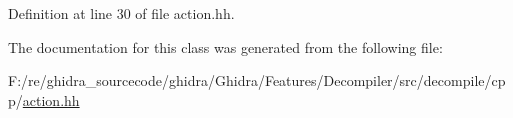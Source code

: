 Definition at line 30 of file action.\+hh.



The documentation for this class was generated from the following file\+:\begin{DoxyCompactItemize}
\item 
F\+:/re/ghidra\+\_\+sourcecode/ghidra/\+Ghidra/\+Features/\+Decompiler/src/decompile/cpp/\mbox{\hyperlink{action_8hh}{action.\+hh}}\end{DoxyCompactItemize}
